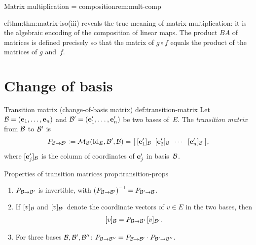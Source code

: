 \begin{remark}{Matrix multiplication = composition}{rem:mult-comp}

ef{thm:thm:matrix-iso}(iii) reveals the true meaning of matrix
multiplication: it is the algebraic encoding of the composition of
linear maps. The product $BA$ of matrices is defined precisely so that
the matrix of $g\circ f$ equals the product of the matrices of $g$
and~$f$.
\end{remark}


\section{Change of basis}\label{sec:change-of-basis}

\begin{definition}{Transition matrix (change-of-basis matrix)}%
{def:transition-matrix}
Let ${\mathcal{B}} = (\mathbf{e}_{1},\ldots,\mathbf{e}_{n})$ and
${\mathcal{B}}' = (\mathbf{e}_{1}',\ldots,\mathbf{e}_{n}')$ be two bases of~$E$.
The \emph{transition matrix} from ${\mathcal{B}}$ to ${\mathcal{B}}'$ is
\[
  P_{{\mathcal{B}}\to{\mathcal{B}}'} \coloneqq \mathcal{M}_{{\mathcal{B}}}(\operatorname{Id}_E,{\mathcal{B}}',{\mathcal{B}})
  = \bigl[\,[\mathbf{e}_{1}']_{\mathcal{B}} \;\; [\mathbf{e}_{2}']_{\mathcal{B}} \;\; \cdots \;\;
    [\mathbf{e}_{n}']_{\mathcal{B}}\,\bigr],
\]
where $[\mathbf{e}_{j}']_{\mathcal{B}}$ is the column of coordinates of $\mathbf{e}_{j}'$
in basis~${\mathcal{B}}$.
\end{definition}

\begin{proposition}{Properties of transition matrices}%
{prop:transition-props}
\begin{enumerate}[label=(\roman*)]
  \item $P_{{\mathcal{B}}\to{\mathcal{B}}'}$ is invertible, with
    ${(P_{{\mathcal{B}}\to{\mathcal{B}}'})}^{-1} = P_{{\mathcal{B}}'\to{\mathcal{B}}}$.
  \item If $[v]_{\mathcal{B}}$ and $[v]_{{\mathcal{B}}'}$ denote the coordinate
    vectors of $v\in E$ in the two bases, then
    \[
      [v]_{\mathcal{B}} = P_{{\mathcal{B}}\to{\mathcal{B}}'}\,[v]_{{\mathcal{B}}'}.
    \]
  \item For three bases ${\mathcal{B}},{\mathcal{B}}',{\mathcal{B}}''$:
    $P_{{\mathcal{B}}\to{\mathcal{B}}''} = P_{{\mathcal{B}}\to{\mathcal{B}}'}\cdot P_{{\mathcal{B}}'\to{\mathcal{B}}''}$.
\end{enumerate}
\end{proposition}

